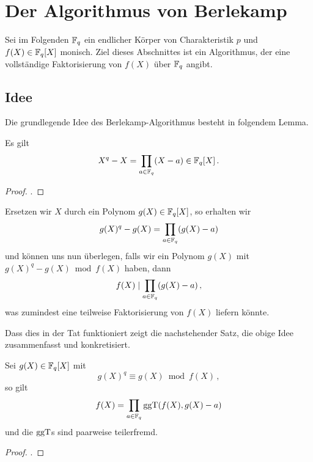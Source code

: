 \section{Der Algorithmus von Berlekamp}
Sei im Folgenden $\mathbb{F}_q$ ein endlicher Körper von Charakteristik $p$ und
$f(X) \in \mathbb{F}_q[X]$ monisch. Ziel dieses Abschnittes ist ein Algorithmus, der eine
vollständige Faktorisierung von $f(X)$ über $\mathbb{F}_q$ angibt.

\subsection{Idee}
Die grundlegende Idee des Berlekamp-Algorithmus besteht in folgendem Lemma.

\begin{lemma}\label{lemma:berlekamp1}
  Es gilt
  \[ X^q - X = \prod_{a\in \mathbb{F}_q} (X- a) \in \mathbb{F}_q[X] \,.\]
\end{lemma}
\begin{proof}
 \autocite[Theorem 6.1 mit Corollary 4.5]{wan2003lectures}.
\end{proof}

Ersetzen wir $X$ durch ein Polynom $g(X) \in \mathbb{F}_q[X]$, so erhalten wir 
\[ g(X)^q - g(X) = \prod_{a\in \mathbb{F}_q} (g(X) - a)\]
und können uns nun überlegen, falls wir ein Polynom $g(X)$ mit
$g(X)^q - g(X) \bmod f(X)$ haben, dann 
\[ f(X) \mid \prod_{a\in \mathbb{F}_q} (g(X)-a) \,,\]
was zumindest eine teilweise Faktorisierung von $f(X)$ liefern könnte.

Dass dies in der Tat funktioniert zeigt die nachstehender Satz, die obige
Idee zusammenfasst und konkretisiert.


\begin{thm}
  \label{satz:berlekamp1}
  Sei $g(X) \in \mathbb{F}_q[X]$ mit 
  \[ g(X)^q \equiv g(X)  \bmod f(X)\,,\]
  so gilt
  \[ f(X) = \prod_{a\in \mathbb{F}_q} \operatorname{ggT}(f(X),g(X)-a)\]
  und die $\operatorname{ggT}$s sind paarweise teilerfremd.
\end{thm}
\begin{proof}
  \autocite[Theorem 9.1]{wan2003lectures}.
\end{proof}


